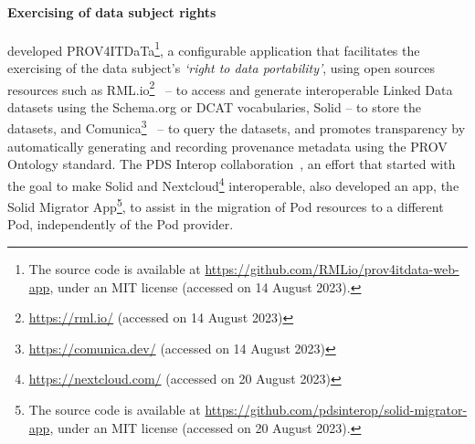 \paragraph{Exercising of data subject rights} 
\cite{de_mulder_prov4itdata_2021} developed PROV4ITDaTa\footnote{The source code is available at \url{https://github.com/RMLio/prov4itdata-web-app}, under an MIT license (accessed on 14 August 2023).}, a configurable application that facilitates the exercising of the data subject's \textit{`right to data portability'}, using open sources resources such as RML.io\footnote{\url{https://rml.io/} (accessed on 14 August 2023)}~\citep{dimou_rml_2014} -- to access and generate interoperable Linked Data datasets using the Schema.org or DCAT vocabularies, Solid -- to store the datasets, and Comunica\footnote{\url{https://comunica.dev/} (accessed on 14 August 2023)}~\citep{taelman_comunica_2018} -- to query the datasets, and promotes transparency by automatically generating and recording provenance metadata using the PROV Ontology standard.
The PDS Interop collaboration~\citeyearpar{noauthor_pds_2021}, an effort that started with the goal to make Solid and Nextcloud\footnote{\url{https://nextcloud.com/} (accessed on 20 August 2023)} interoperable, also developed an app, the Solid Migrator App\footnote{The source code is available at \url{https://github.com/pdsinterop/solid-migrator-app}, under an MIT license (accessed on 20 August 2023).}, to assist in the migration of Pod resources to a different Pod, independently of the Pod provider.


